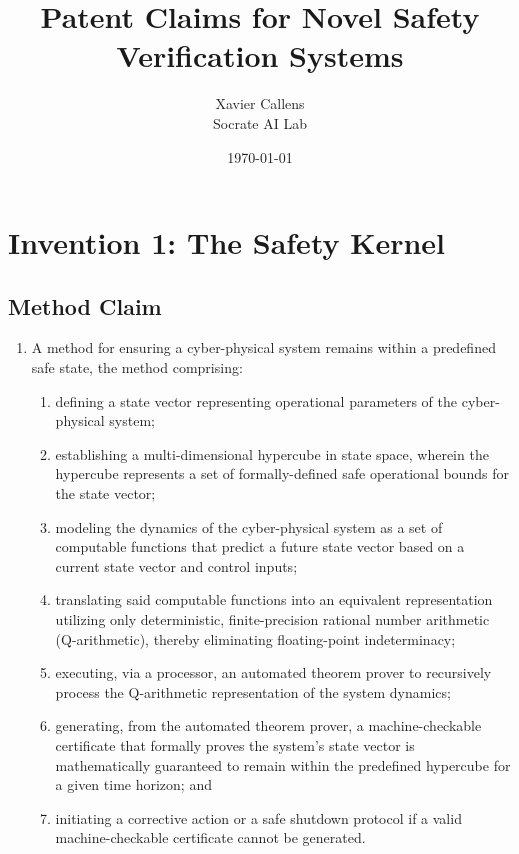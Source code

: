 \documentclass{article}
\title{\textbf{Patent Claims for Novel Safety Verification Systems}}
\author{Xavier Callens \\ Socrate AI Lab}
\date{\today}
\begin{document}
\maketitle

\section{Invention 1: The Safety Kernel}

\subsection*{Method Claim}
\begin{enumerate}
    \item A method for ensuring a cyber-physical system remains within a predefined safe state, the method comprising:
    \begin{enumerate}
        \item defining a state vector representing operational parameters of the cyber-physical system;
        \item establishing a multi-dimensional hypercube in state space, wherein the hypercube represents a set of formally-defined safe operational bounds for the state vector;
        \item modeling the dynamics of the cyber-physical system as a set of computable functions that predict a future state vector based on a current state vector and control inputs;
        \item translating said computable functions into an equivalent representation utilizing only deterministic, finite-precision rational number arithmetic (Q-arithmetic), thereby eliminating floating-point indeterminacy;
        \item executing, via a processor, an automated theorem prover to recursively process the Q-arithmetic representation of the system dynamics;
        \item generating, from the automated theorem prover, a machine-checkable certificate that formally proves the system's state vector is mathematically guaranteed to remain within the predefined hypercube for a given time horizon; and
        \item initiating a corrective action or a safe shutdown protocol if a valid machine-checkable certificate cannot be generated.
    \end{enumerate}
\end{enumerate}
\end{document}
